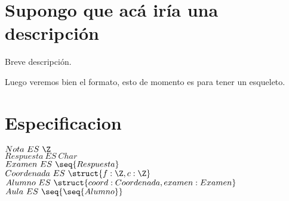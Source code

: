 \documentclass[11pt,a4paper]{article}
\begin{document}
\maketitle

\section{Supongo que acá iría una descripción}

Breve descripción.

Luego veremos bien el formato, esto de momento es para tener un esqueleto.

\section{Especificacion}

$Nota\ ES\ \Z$\\
$Respuesta\ ES\ Char$\\
$Examen\ ES\ \seq{Respuesta}$\\
$Coordenada\ ES\ \struct{f:\Z, c:\Z}$\\
$Alumno\ ES\ \struct{coord:Coordenada, examen:Examen}$\\
$Aula\ ES\ \seq{\seq{Alumno}}$\\
\end{document}
